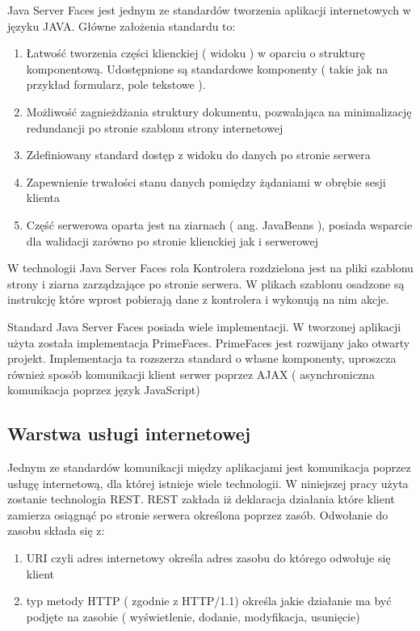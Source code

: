 Java Server Faces jest jednym ze standardów tworzenia aplikacji internetowych w języku JAVA\cite{jsfRef}. Główne założenia standardu to:
\begin{enumerate}
  \item Łatwość tworzenia części klienckiej ( widoku ) w oparciu o strukturę komponentową. Udostępnione są standardowe komponenty ( takie jak na przykład formularz, pole tekstowe ).
  \item Możliwość zagnieżdżania struktury dokumentu, pozwalająca na minimalizację redundancji po stronie szablonu strony internetowej 
  \item Zdefiniowany standard dostęp z widoku do danych po stronie serwera
  \item Zapewnienie trwałości stanu danych pomiędzy żądaniami w obrębie sesji klienta
  \item Część serwerowa oparta jest na ziarnach ( ang. JavaBeans ), posiada wsparcie dla walidacji zarówno po stronie klienckiej jak i serwerowej
\end{enumerate}

W technologii Java Server Faces rola Kontrolera rozdzielona jest na pliki szablonu strony i ziarna zarządzające po stronie serwera. W plikach szablonu osadzone są instrukcję które wprost pobierają dane z kontrolera i wykonują na nim akcje.

Standard Java Server Faces posiada wiele implementacji. W tworzonej aplikacji użyta została implementacja PrimeFaces\cite{primeFaces}. PrimeFaces jest rozwijany jako otwarty projekt. Implementacja ta rozszerza standard o własne komponenty, uproszcza również sposób komunikacji klient serwer poprzez AJAX ( asynchroniczna komunikacja poprzez język JavaScript)

\subsection{Warstwa usługi internetowej}



Jednym ze standardów komunikacji między aplikacjami jest komunikacja poprzez usługę internetową, dla której istnieje wiele technologii. W niniejszej pracy użyta zostanie technologia REST. REST zakłada iż deklaracja działania które klient zamierza osiągnąć po stronie serwera określona poprzez zasób. Odwołanie do zasobu składa się z:
\begin{enumerate}
  \item URI czyli adres internetowy określa adres zasobu do którego odwołuje się klient
  \item  typ metody HTTP ( zgodnie z HTTP/1.1) określa jakie działanie ma być podjęte na zasobie ( wyświetlenie, dodanie, modyfikacja, usunięcie)
\end{enumerate}

